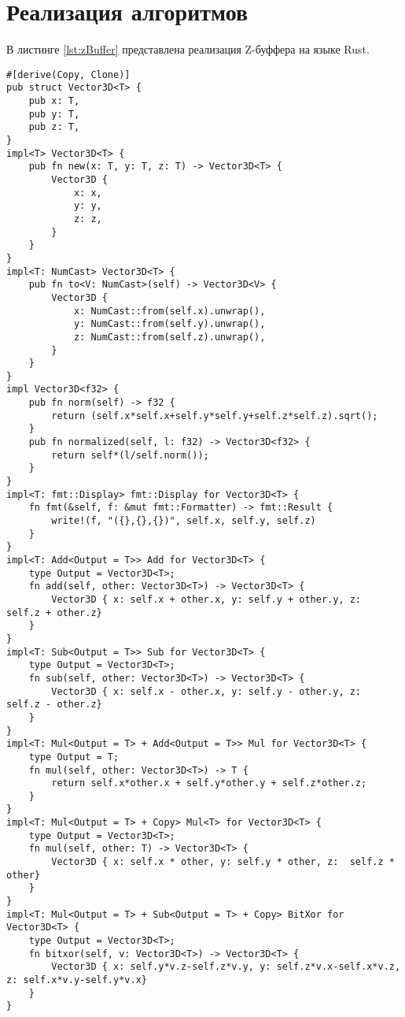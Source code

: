 \section{Реализация алгоритмов}

В листинге \ref{lst:zBuffer} представлена реализация Z-буффера на языке Rust.

\begin{lstlisting}[style=rust, label=lst:zBuffer, caption={Реализация алгоритма Z-буффера}]
#[derive(Copy, Clone)]
pub struct Vector3D<T> {
    pub x: T,
    pub y: T,
    pub z: T,
}
impl<T> Vector3D<T> {
    pub fn new(x: T, y: T, z: T) -> Vector3D<T> {
        Vector3D {
            x: x,
            y: y,
            z: z,
        }
    }
}
impl<T: NumCast> Vector3D<T> {
    pub fn to<V: NumCast>(self) -> Vector3D<V> {
        Vector3D {
            x: NumCast::from(self.x).unwrap(),
            y: NumCast::from(self.y).unwrap(),
            z: NumCast::from(self.z).unwrap(),
        }
    }
}
impl Vector3D<f32> {
    pub fn norm(self) -> f32 {
        return (self.x*self.x+self.y*self.y+self.z*self.z).sqrt();
    }
    pub fn normalized(self, l: f32) -> Vector3D<f32> {
        return self*(l/self.norm());
    }
}
impl<T: fmt::Display> fmt::Display for Vector3D<T> {
    fn fmt(&self, f: &mut fmt::Formatter) -> fmt::Result {
        write!(f, "({},{},{})", self.x, self.y, self.z)
    }
}
impl<T: Add<Output = T>> Add for Vector3D<T> {
    type Output = Vector3D<T>;
    fn add(self, other: Vector3D<T>) -> Vector3D<T> {
        Vector3D { x: self.x + other.x, y: self.y + other.y, z:  self.z + other.z}
    }
}
impl<T: Sub<Output = T>> Sub for Vector3D<T> {
    type Output = Vector3D<T>;
    fn sub(self, other: Vector3D<T>) -> Vector3D<T> {
        Vector3D { x: self.x - other.x, y: self.y - other.y, z:  self.z - other.z}
    }
}
impl<T: Mul<Output = T> + Add<Output = T>> Mul for Vector3D<T> {
    type Output = T;
    fn mul(self, other: Vector3D<T>) -> T {
        return self.x*other.x + self.y*other.y + self.z*other.z;
    }
}
impl<T: Mul<Output = T> + Copy> Mul<T> for Vector3D<T> {
    type Output = Vector3D<T>;
    fn mul(self, other: T) -> Vector3D<T> {
        Vector3D { x: self.x * other, y: self.y * other, z:  self.z * other}
    }
}
impl<T: Mul<Output = T> + Sub<Output = T> + Copy> BitXor for Vector3D<T> {
    type Output = Vector3D<T>;
    fn bitxor(self, v: Vector3D<T>) -> Vector3D<T> {
        Vector3D { x: self.y*v.z-self.z*v.y, y: self.z*v.x-self.x*v.z, z: self.x*v.y-self.y*v.x}
    }
}
\end{lstlisting}

